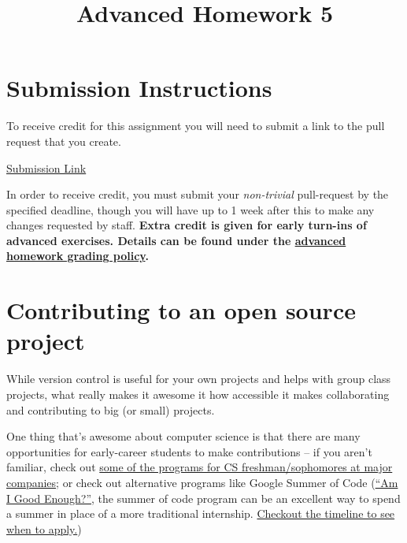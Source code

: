 \documentclass{article}
\begin{document}
\fancyfoot[C]{\color{gray} \thepage~/~\pageref*{LastPage}}
\pagestyle{fancyplain}

\title{\textbf{Advanced Homework 5\\}}
\author{\textbf{\color{red}{Due: Wednesday, February 14th, 11:59PM (Hard Deadline)}}}
\date{}
\maketitle


\section*{Submission Instructions}
To receive credit for this assignment you will need to submit a link to the pull request that you create.

\begin{center}
{\large \href{https://goo.gl/forms/gyRgb2v30iwGtC5l2}{\underline{Submission Link}}}
\end{center}

In order to receive credit, you must submit your \emph{non-trivial} pull-request by the specified deadline, though you will have up to 1 week after this to make any changes requested by staff. \textbf{Extra credit is given for early turn-ins of advanced exercises. Details can be found under the \href{https://c4cs.github.io/\#syllabus-advanced}{advanced homework grading policy}.}

\section*{Contributing to an open source project}

While version control is useful for your own projects and helps with group
class projects, what really makes it awesome it how accessible it makes
collaborating and contributing to big (or small) projects.

One thing that's awesome about computer science is that there are many
opportunities for early-career students to make contributions -- if you aren't
familiar, check out
\href{https://www.quora.com/What-companies-have-internship-programs-specifically-for-college-freshmen-and-sophomores}{some
  of the programs for CS freshman/sophomores at major companies}; or check out
alternative programs like Google Summer of Code
(\href{http://write.flossmanuals.net/gsocstudentguide/am-i-good-enough/}
{``Am I Good Enough?''}, the summer of code program can be an excellent way to
spend a summer in place of a more traditional internship.
\href{https://developers.google.com/open-source/gsoc/timeline}
  {Checkout the timeline to see when to apply.})
\end{document}
